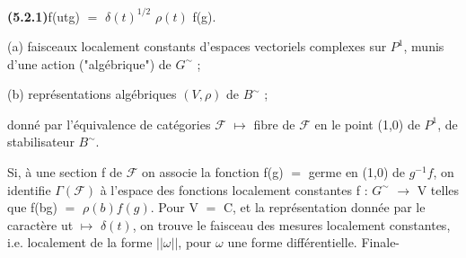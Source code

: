 \documentclass[10pt,a4paper]{article}
\begin{document}
\par\noindent\textbf{(5.2.1)}\quad f(utg) $=$ $\delta{}(t)^{1/2}$ $\rho{}(t)$ f(g).\par
\par\medskip{}\par\smallskip
\par (a) faisceaux localement constants d'espaces vectoriels complexes sur $P^1$, munis d'une action ("algébrique") de $G^\sim$ ;\par
\par (b) représentations algébriques $(V,\rho{})$ de $B^\sim$ ;\par
\par donné par l'équivalence de catégories $\mathcal{F}$ $\mapsto{}$ fibre de $\mathcal{F}$ en le point (1,0) de $P^1$, de stabilisateur $B^\sim$.\par
\par Si, à une section f de $\mathcal{F}$ on associe la fonction f(g) $=$ germe en (1,0) de $g^{-1}f$, on identifie $\Gamma{}(\mathcal{F})$ à l'espace des fonctions localement constantes f : $G^\sim$ $\to{}$ V telles que f(bg) $=$ $\rho{}(b)f(g)$. Pour V $=$ C, et la représentation donnée par le caractère ut $\mapsto{}$ $\delta{}(t)$, on trouve le faisceau des mesures localement constantes, i.e. localement de la forme $||\omega{}||$, pour $\omega{}$ une forme différentielle. Finale-\par
\end{document}
